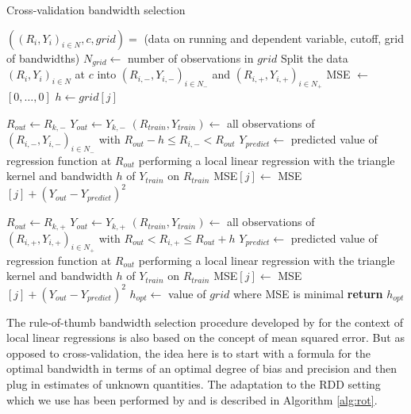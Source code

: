 \begin{algorithm}[H]
	\caption{Cross-validation bandwidth selection}\label{alg:cv}
	\begin{algorithmic}[1]
		\Require $((R_{i}, Y_{i})_{i \in N}, c, grid) =$ (data on running and dependent variable, cutoff, grid of bandwidths)
		\State $N_{grid} \gets$ number of observations in $grid$
		\State Split the data $(R_{i}, Y_{i})_{i \in N}$ at $c$ into $(R_{i, -}, Y_{i, -})_{i \in N_{-}}$ and $(R_{i, +}, Y_{i, +})_{i \in N_{+}}$
		\State MSE $\gets$ $\left[ 0, \dots, 0 \right]$
		\State $h \gets grid[j]$

		\State $R_{out} \gets R_{k, -}$
		\State $Y_{out} \gets Y_{k, -}$
		\State $\left(R_{train}, Y_{train}\right) \gets$ all observations of $(R_{i, -}, Y_{i, -})_{i \in N_{-}}$ with $R_{out}-h \leq R_{i, -} < R_{out}$
		\State $Y_{predict} \gets$ predicted value of regression function at $R_{out}$ performing a local linear \newline
		\mbox{} regression with the triangle kernel and bandwidth $h$ of $Y_{train}$ on $R_{train}$
		\State MSE$[j] \gets$ MSE$[j] + \left( Y_{out} - Y_{predict} \right)^{2}$
		\EndFor

		\State $R_{out} \gets R_{k, +}$
		\State $Y_{out} \gets Y_{k, +}$
		\State $\left(R_{train}, Y_{train}\right) \gets$ all observations of  $(R_{i, +}, Y_{i, +})_{i \in N_{+}}$ with $R_{out} < R_{i, +} \leq R_{out}+h $
		\State $Y_{predict} \gets$ predicted value of regression function at $R_{out}$ performing a local linear \newline
		\mbox{} regression with the triangle kernel and bandwidth $h$ of $Y_{train}$ on $R_{train}$
		\State MSE$[j] \gets$ MSE$[j] + \left( Y_{out} - Y_{predict} \right)^{2}$
		\EndFor
		\EndFor
		\State $h_{opt} \gets$ value of $grid$ where MSE is minimal
		\State \textbf{return} $h_{opt}$
	\end{algorithmic}
\end{algorithm}

The rule-of-thumb bandwidth selection procedure developed by \cite{fan_gij} for the context of local linear regressions is also based on the concept of mean squared error. But as opposed to cross-validation, the idea here is to start with a formula for the optimal bandwidth in terms of an optimal degree of bias and precision and then plug in estimates of unknown quantities. The adaptation to the RDD setting which we use has been performed by \cite{imbens_kalyanaraman} and is described in Algorithm \ref{alg:rot}.

